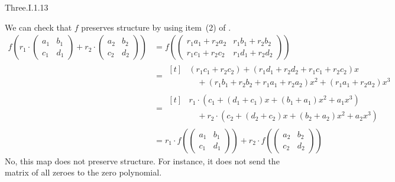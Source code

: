\begin{ans}{Three.I.1.13}
\begin{exparts}
        We can check that $f$ preserves structure by using
        item~(2) of .
        \begin{align*}
          f(r_1\cdot\begin{pmatrix}
              a_1  &b_1  \\
              c_1  &d_1
            \end{pmatrix}
            +r_2\cdot\begin{pmatrix}
              a_2  &b_2  \\
              c_2  &d_2
            \end{pmatrix})
           &=
           f(\begin{pmatrix}
               r_1a_1+r_2a_2  &r_1b_1+r_2b_2  \\
               r_1c_1+r_2c_2  &r_1d_1+r_2d_2
             \end{pmatrix})                         \\
           &=\begin{aligned}[t]
               &(r_1c_1+r_2c_2)
               +(r_1d_1+r_2d_2+r_1c_1+r_2c_2)x                 \\
               &\mbox{}\quad +(r_1b_1+r_2b_2+r_1a_1+r_2a_2)x^2
                 +(r_1a_1+r_2a_2)x^3
             \end{aligned}                   \\
           &=\begin{aligned}[t]
                &r_1\cdot\left(c_1+(d_1+c_1)x+(b_1+a_1)x^2+a_1x^3\right) \\
                &\mbox{}\quad +r_2\cdot\left(c_2+(d_2+c_2)x
                            +(b_2+a_2)x^2+a_2x^3\right)
              \end{aligned} \\
           &=r_1\cdot f(\begin{pmatrix}
              a_1  &b_1  \\
              c_1  &d_1
            \end{pmatrix})
            +r_2\cdot f(\begin{pmatrix}
              a_2  &b_2  \\
              c_2  &d_2
            \end{pmatrix})
        \end{align*}
      \partsitem No, this map does not preserve structure.
        For instance, it does not send the matrix of all zeroes
        to the zero polynomial.
    \end{exparts}
   
\end{ans}
